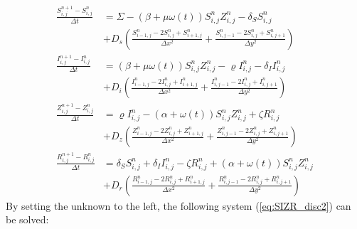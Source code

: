 \documentclass[%
twoside,                 %
final,                   %
10pt]{article}
\begin{document}
\begin{equation} \label{eq:SIZR_disc}
	\begin{aligned}
    \frac{S^{n+1}_{i,j}-S^n_{i,j}}{\Delta t} &= \Sigma - (\beta+\mu \omega(t))S^{n}_{i,j}Z^{n}_{i,j}- \delta_S S^{n}_{i,j} \\
        &+D_s\left(\frac{S^{n}_{i-1,j}-2S^{n}_{i,j}+S^{n}_{i+1,j}}{\Delta x^2}+\frac{S^{n}_{i,j-1}-2S^{n}_{i,j}+S^{n}_{i,j+1}}{\Delta y^2}\right) \\
    \frac{I^{n+1}_{i,j}-I^n_{i,j}}{\Delta t} &= (\beta+\mu \omega(t))S^{n}_{i,j}Z^{n}_{i,j}-\varrho I^{n}_{i,j}- \delta_I I^{n}_{i,j} \\
        &+D_i\left(\frac{I^{n}_{i-1,j}-2I^{n}_{i,j}+I^{n}_{i+1,j}}{\Delta x^2}+\frac{I^{n}_{i,j-1}-2I^{n}_{i,j}+I^{n}_{i,j+1}}{\Delta y^2}\right) \\
    \frac{Z^{n+1}_{i,j}-Z^n_{i,j}}{\Delta t} &= \varrho I^{n}_{i,j}-(\alpha+\omega(t))S^{n}_{i,j}Z^{n}_{i,j}+ \zeta R^{n}_{i,j} \\
        &+D_z\left(\frac{Z^{n}_{i-1,j}-2Z^{n}_{i,j}+Z^{n}_{i+1,j}}{\Delta x^2}+\frac{Z^{n}_{i,j-1}-2Z^{n}_{i,j}+Z^{n}_{i,j+1}}{\Delta y^2}\right) \\
    \frac{R^{n+1}_{i,j}-R^n_{i,j}}{\Delta t} &= \delta_S S^{n}_{i,j}+\delta_I I^{n}_{i,j}-\zeta R^{n}_{i,j}+(\alpha+\omega(t))S^{n}_{i,j}Z^{n}_{i,j} \\
        &+D_r\left(\frac{R^{n}_{i-1,j}-2R^{n}_{i,j}+R^{n}_{i+1,j}}{\Delta x^2}+\frac{R^{n}_{i,j-1}-2R^{n}_{i,j}+R^{n}_{i,j+1}}{\Delta y^2}\right) 
	\end{aligned}
\end{equation}
By setting the unknown to the left, the following system (\ref{eq:SIZR_disc2}) can be solved: 
\end{document}
